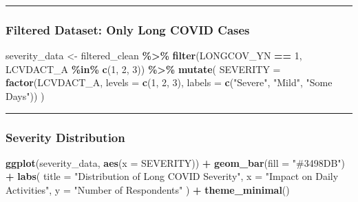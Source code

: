 \documentclass[
]{article}
\newenvironment{Shaded}{\begin{snugshade}}{\end{snugshade}}
\newcommand{\AttributeTok}[1]{\textcolor[rgb]{0.13,0.29,0.53}{#1}}
\newcommand{\DecValTok}[1]{\textcolor[rgb]{0.00,0.00,0.81}{#1}}
\newcommand{\FunctionTok}[1]{\textcolor[rgb]{0.13,0.29,0.53}{\textbf{#1}}}
\newcommand{\NormalTok}[1]{#1}
\newcommand{\OtherTok}[1]{\textcolor[rgb]{0.56,0.35,0.01}{#1}}
\newcommand{\SpecialCharTok}[1]{\textcolor[rgb]{0.81,0.36,0.00}{\textbf{#1}}}
\newcommand{\StringTok}[1]{\textcolor[rgb]{0.31,0.60,0.02}{#1}}
\begin{document}
\begin{center}\rule{0.5\linewidth}{0.5pt}\end{center}

\subsubsection{Filtered Dataset: Only Long COVID
Cases}\label{filtered-dataset-only-long-covid-cases}

\begin{Shaded}
\begin{Highlighting}[]
\NormalTok{severity\_data }\OtherTok{\textless{}{-}}\NormalTok{ filtered\_clean }\SpecialCharTok{\%\textgreater{}\%}
  \FunctionTok{filter}\NormalTok{(LONGCOV\_YN }\SpecialCharTok{==} \DecValTok{1}\NormalTok{, LCVDACT\_A }\SpecialCharTok{\%in\%} \FunctionTok{c}\NormalTok{(}\DecValTok{1}\NormalTok{, }\DecValTok{2}\NormalTok{, }\DecValTok{3}\NormalTok{)) }\SpecialCharTok{\%\textgreater{}\%}
  \FunctionTok{mutate}\NormalTok{(}
    \AttributeTok{SEVERITY =} \FunctionTok{factor}\NormalTok{(LCVDACT\_A, }\AttributeTok{levels =} \FunctionTok{c}\NormalTok{(}\DecValTok{1}\NormalTok{, }\DecValTok{2}\NormalTok{, }\DecValTok{3}\NormalTok{),}
                      \AttributeTok{labels =} \FunctionTok{c}\NormalTok{(}\StringTok{"Severe"}\NormalTok{, }\StringTok{"Mild"}\NormalTok{, }\StringTok{"Some Days"}\NormalTok{))}
\NormalTok{  )}
\end{Highlighting}
\end{Shaded}

\begin{center}\rule{0.5\linewidth}{0.5pt}\end{center}

\subsubsection{Severity Distribution}\label{severity-distribution}

\begin{Shaded}
\begin{Highlighting}[]
\FunctionTok{ggplot}\NormalTok{(severity\_data, }\FunctionTok{aes}\NormalTok{(}\AttributeTok{x =}\NormalTok{ SEVERITY)) }\SpecialCharTok{+}
  \FunctionTok{geom\_bar}\NormalTok{(}\AttributeTok{fill =} \StringTok{"\#3498DB"}\NormalTok{) }\SpecialCharTok{+}
  \FunctionTok{labs}\NormalTok{(}
    \AttributeTok{title =} \StringTok{"Distribution of Long COVID Severity"}\NormalTok{,}
    \AttributeTok{x =} \StringTok{"Impact on Daily Activities"}\NormalTok{,}
    \AttributeTok{y =} \StringTok{"Number of Respondents"}
\NormalTok{  ) }\SpecialCharTok{+}
  \FunctionTok{theme\_minimal}\NormalTok{()}
\end{Highlighting}
\end{Shaded}
\end{document}
